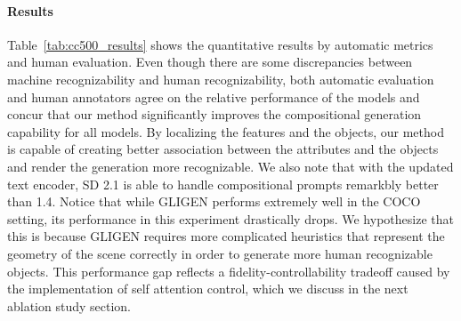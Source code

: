 \paragraph{Results}
Table~\ref{tab:cc500_results} shows the quantitative results by automatic metrics and human evaluation. Even though there are some discrepancies between machine recognizability and human recognizability, both automatic evaluation and human annotators agree on the relative performance of the models and concur that our method significantly improves the compositional generation capability for all models. By localizing the features and the objects, our method is capable of creating better association between the attributes and the objects and render the generation more recognizable.
We also note that with the updated text encoder, SD 2.1 is able to handle compositional prompts remarkbly better than 1.4. 
Notice that while GLIGEN performs extremely well in the COCO setting, its performance in this experiment drastically drops. We hypothesize that this is because GLIGEN requires more complicated heuristics that represent the geometry of the scene correctly in order to generate more human recognizable objects. This performance gap reflects a fidelity-controllability tradeoff caused by the implementation of self attention control, which we discuss in the next ablation study section.
